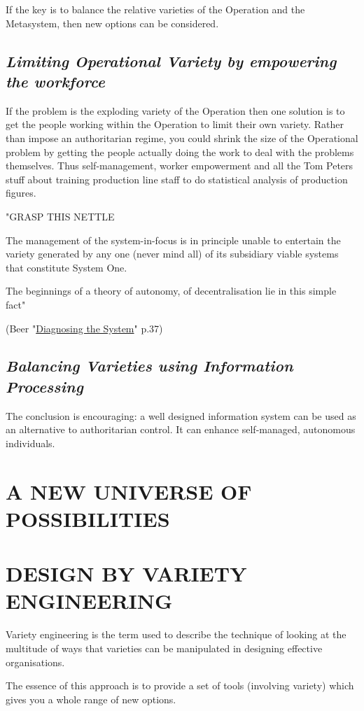 If the key is to balance the relative varieties of the Operation and the Metasystem, then new options can be considered.

\subsection*{\textit{Limiting Operational Variety by empowering the workforce}}
If the problem is the exploding variety of the Operation then one solution is to get the people working within the Operation to limit their own variety. Rather than impose an authoritarian regime, you could shrink the size of the Operational problem by getting the people actually doing the work to deal with the problems themselves. Thus self-management, worker empowerment and all the Tom Peters stuff about training production line staff to do statistical analysis of production figures.

"GRASP THIS NETTLE

The management of the system-in-focus is in principle unable to entertain the variety generated by any one (never mind all) of its subsidiary viable systems that constitute System One.

The beginnings of a theory of autonomy, of decentralisation lie in this simple fact"

(Beer "\href{https://vsmg.lrc.org.uk/screen.php?=bibliography}{Diagnosing the System}" p.37)

\subsection*{\textit{Balancing Varieties using Information Processing}}
The conclusion is encouraging: a well designed information system can be used as an alternative to authoritarian control. It can enhance self-managed, autonomous individuals.

\section*{A NEW UNIVERSE OF POSSIBILITIES}

\section*{DESIGN BY VARIETY ENGINEERING}
Variety engineering is the term used to describe the technique of looking at the multitude of ways that varieties can be manipulated in designing effective organisations.

The essence of this approach is to provide a set of tools (involving variety) which gives you a whole range of new options.

